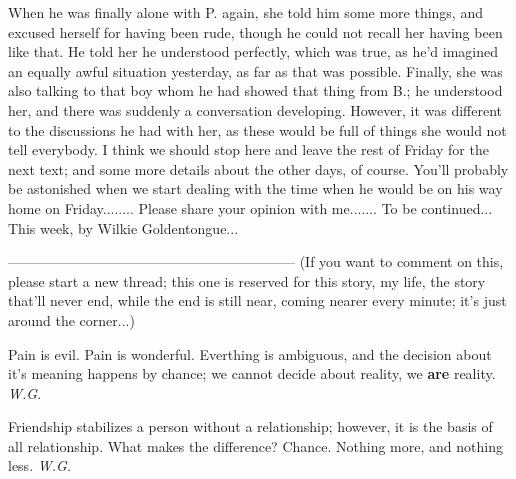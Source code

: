 When he was finally alone with P. again, she told him some more things, and excused herself for having been rude, though he could not recall her having been like that. He told her he understood perfectly, which was true, as he'd imagined an equally awful situation yesterday, as far as that was possible. Finally, she was also talking to that boy whom he had showed that thing from B.; he understood her, and there was suddenly a conversation developing. However, it was different to the discussions he had with her, as these would be full of things she would not tell everybody. 
I think we should stop here and leave the rest of Friday for the next text; and some more details about the other days, of course. You'll probably be astonished when we start dealing with the time when he would be on his way home on Friday........
Please share your opinion with me.......
To be continued...
This week, by Wilkie Goldentongue...

--------------------------------------------------------------
(If you want to comment on this, please start a new thread; this one is reserved for this story, my life, the story that'll never end, while the end is still near, coming nearer every minute; it's just around the corner...)

Pain 
is evil. 
Pain 
is wonderful. 
Everthing is ambiguous, 
and the decision about it's meaning 
happens by chance; 
we cannot decide about reality, 
we \textbf{are} reality. 
\emph{W.G.}

Friendship 
stabilizes a person without a relationship; 
however, it is the basis of all relationship. 
What makes the difference? 
Chance. 
Nothing more, 
and nothing less. 
\emph{W.G.}
